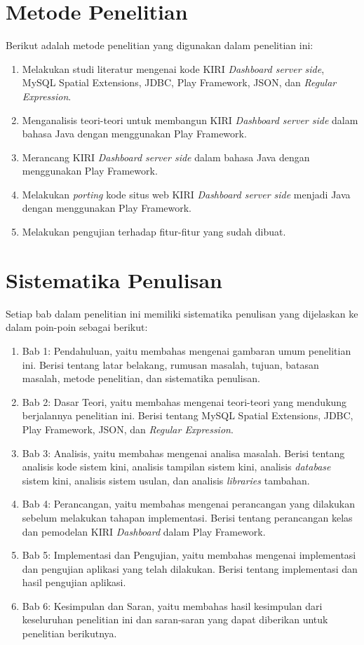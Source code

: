 \section{Metode Penelitian}
\label{sec:metode_penelitian}
Berikut adalah metode penelitian yang digunakan dalam penelitian ini:
	\begin{enumerate}
		\item Melakukan studi literatur mengenai kode KIRI \textit{Dashboard server side}, MySQL Spatial Extensions, JDBC, Play Framework, JSON, dan \textit{Regular Expression}.
		\item Menganalisis teori-teori untuk membangun KIRI \textit{Dashboard server side} dalam bahasa Java dengan menggunakan Play Framework.
		\item Merancang KIRI \textit{Dashboard server side} dalam bahasa Java dengan menggunakan Play Framework.
		\item Melakukan \textit{porting} kode situs web KIRI \textit{Dashboard server side} menjadi Java dengan menggunakan Play Framework.
		\item Melakukan pengujian terhadap fitur-fitur yang sudah dibuat.
	\end{enumerate}

\section{Sistematika Penulisan}
\label{sec:sistematika_penulisan}
Setiap bab dalam penelitian ini memiliki sistematika penulisan yang dijelaskan ke dalam poin-poin sebagai berikut:
	\begin{enumerate}
		\item Bab 1: Pendahuluan, yaitu membahas mengenai gambaran umum penelitian ini. Berisi tentang latar belakang, rumusan masalah, tujuan, batasan masalah, metode penelitian, dan sistematika penulisan.
		\item Bab 2: Dasar Teori, yaitu membahas mengenai teori-teori yang mendukung berjalannya penelitian ini. Berisi tentang MySQL Spatial Extensions, JDBC, Play Framework, JSON, dan \textit{Regular Expression}.
		\item Bab 3: Analisis, yaitu membahas mengenai analisa masalah. Berisi tentang analisis kode sistem kini, analisis tampilan sistem kini, analisis \textit{database} sistem kini, analisis sistem usulan, dan analisis \textit{libraries} tambahan.
		\item Bab 4: Perancangan, yaitu membahas mengenai perancangan yang dilakukan sebelum melakukan tahapan implementasi. Berisi tentang perancangan kelas dan pemodelan KIRI \textit{Dashboard} dalam Play Framework.
		\item Bab 5: Implementasi dan Pengujian, yaitu membahas mengenai implementasi dan pengujian aplikasi yang telah dilakukan. Berisi tentang implementasi dan hasil pengujian aplikasi.
		\item Bab 6: Kesimpulan dan Saran, yaitu membahas hasil kesimpulan dari keseluruhan penelitian ini dan saran-saran yang dapat diberikan untuk penelitian berikutnya.
	\end{enumerate}